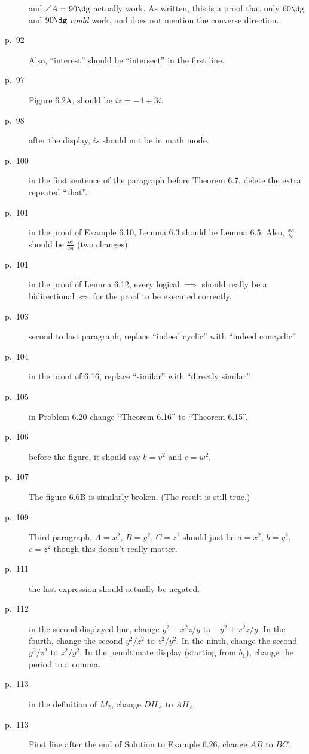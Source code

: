 \documentclass[11pt]{scrartcl}
\begin{document}
\begin{description}
  and $\angle A = 90\dg$ actually work.
  As written, this is a proof that only $60\dg$ and $90\dg$ \emph{could} work,
  and does not mention the converse direction.
\item[p.\  92] 
  Also, ``interest'' should be ``intersect'' in the first line.
\item[p.\  97] Figure 6.2A, should be $iz = -4+3i$.
\item[p.\  98] after the display, $is$ should not be in math mode.
\item[p.\  100] in the first sentence of the paragraph before Theorem 6.7,
  delete the extra repeated ``that''.
\item[p.\  101] in the proof of Example 6.10, Lemma 6.3 should be Lemma 6.5.
  Also, $\frac{xa}{bc}$ should be $\frac{bc}{xa}$ (two changes).
\item[p.\  101] in the proof of Lemma 6.12, every logical $\implies$ should
  really be a bidirectional $\iff$ for the proof to be executed correctly.
\item[p.\  103] second to last paragraph, replace ``indeed cyclic'' with ``indeed concyclic''.
\item[p.\  104] in the proof of 6.16, replace ``similar'' with ``directly similar''.
\item[p.\  105] in Problem 6.20 change ``Theorem 6.16'' to ``Theorem 6.15''.
\item[p.\  106] before the figure, it should say $b = v^2$ and $c = w^2$.
\item[p.\  107] 
  The figure 6.6B is similarly broken.
  (The result is still true.)
\item[p.\  109] Third paragraph, $A=x^2$, $B=y^2$, $C=z^2$
  should just be $a=x^2$, $b=y^2$, $c=z^2$ though this doesn't really matter.
\item[p.\  111] the last expression should actually be negated.
\item[p.\  112] in the second displayed line, change $y^2+x^2z/y$ to $-y^2+x^2z/y$.
  In the fourth, change the second $y^2/z^2$ to $z^2/y^2$.
  In the ninth, change the second $y^2/z^2$ to $z^2/y^2$.
  In the penultimate display (starting from $b_1$), change the period to a comma.
\item[p.\  113] in the definition of $M_2$, change $DH_A$ to $AH_A$.
\item[p.\  113] First line after the end of Solution to Example 6.26,  change $AB$ to $BC$.

\end{description}
\end{document}
